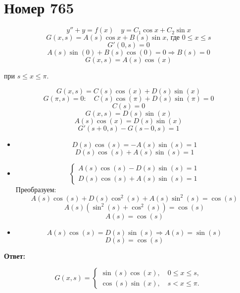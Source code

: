 \section*{Номер 765}

\begin{solution}
    $$ y'' + y = f(x) \quad y = C_1 \cos x + C_2 \sin x $$
    $$ G(x, s) = A(s) \cos x + B(s) \sin x \text{, где  $0 \leq x \leq s$} $$
    $$ G'(0,s) = 0 $$
    $$ A(s)\sin(0) + B(s)\cos(0) = 0 \Rightarrow B(s) = 0 $$
    $$ G(x,s) = A(s) \cos(x) $$

    при $ s \leq x \leq \pi $.

    $$ G(x,s) = C(s) \cos(x) + D(s) \sin(x) $$
    $$ G(\pi,s) = 0: \quad C(s) \cos(\pi) + D(s) \sin(\pi) = 0 $$
    $$ C(s) = 0 $$
    $$ G(x,s) = D(s) \sin(x) $$
    $$ A(s) \cos(x) = D(s) \sin(x) $$
    $$ G'(s+0,s) - G(s-0,s) = 1 $$

    \begin{itemize}
        \item
              $$ D(s) \cos(s) = -A(s) \sin(s) = 1 $$
              $$ D(s) \cos(s) + A(s) \sin(s) = 1 $$
        \item
              $$
                  \begin{cases}
                      A(s) \cos(s) - D(s) \sin(s) = 1 \\
                      D(s) \cos(s) + A(s) \sin(s) = 1
                  \end{cases}
              $$
              Преобразуем:
              $$ A(s) \cos(s) + D(s) \cos^2(s) + A(s) \sin^2(s) = \cos(s) $$
              $$ A(s) (\sin^2(s) + \cos^2(s)) = \cos(s) $$
              $$ A(s) = \cos(s) $$
        \item
              $$ A(s) \cos(s) = D(s) \sin(s) \Rightarrow A(s) = \sin(s) $$
              $$ D(s) = \cos(s) $$
    \end{itemize}

    \textbf{Ответ:}

    $$
        G(x,s) =
        \begin{cases}
            \sin(s) \cos(x), \quad 0 \leq x \leq s, \\
            \cos(s) \sin(x), \quad s < x \leq \pi.
        \end{cases}
    $$

\end{solution}\pagebreak